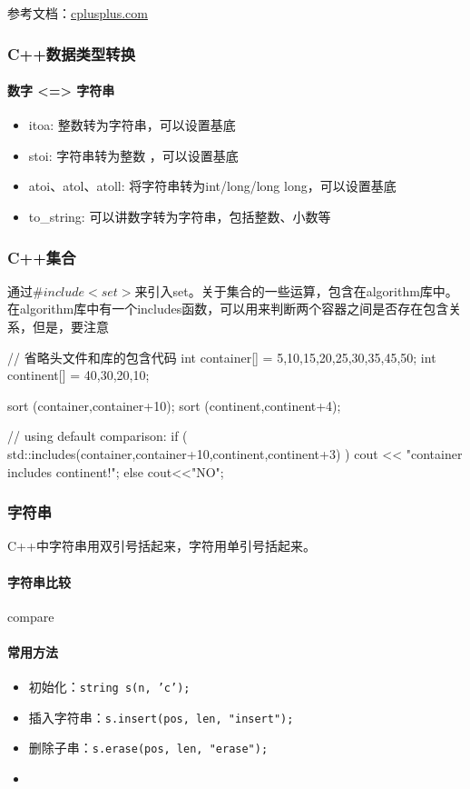 参考文档：\href{https://www.cplusplus.com/}{cplusplus.com}
\subsubsection{C++数据类型转换}
\paragraph{数字 <=> 字符串}
\begin{itemize}
	\item itoa: 整数转为字符串，可以设置基底
	\item stoi: 字符串转为整数 ，可以设置基底
	\item atoi、atol、atoll: 将字符串转为int/long/long long，可以设置基底
	\item to\_string: 可以讲数字转为字符串，包括整数、小数等
\end{itemize}

\subsubsection{C++集合} 通过$\#include<set>$来引入set。关于集合的一些运算，包含在algorithm库中。在algorithm库中有一个includes函数，可以用来判断两个容器之间是否存在包含关系，但是，要注意
\begin{cpp}
	// 省略头文件和库的包含代码
	int container[] = {5,10,15,20,25,30,35,45,50};
	int continent[] = {40,30,20,10};
	
	sort (container,container+10);
	sort (continent,continent+4);
	
	// using default comparison:
	if ( std::includes(container,container+10,continent,continent+3) )
		cout << "container includes continent!\n";
	else	cout<<"NO\n";
	
\end{cpp}


\subsubsection{字符串}
C++中字符串用双引号括起来，字符用单引号括起来。
\paragraph{字符串比较}
compare

\paragraph{常用方法}
\begin{itemize}
	\item 初始化：\texttt{string s(n, 'c');}
	\item 插入字符串：\texttt{s.insert(pos, len, "insert");}
	\item 删除子串：\texttt{s.erase(pos, len, "erase");}
	\item 
\end{itemize}

